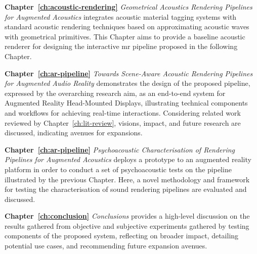 \textbf{Chapter~\ref{ch:acoustic-rendering}} \textit{Geometrical Acoustics Rendering Pipelines for Augmented Acoustics} integrates acoustic material tagging systems with standard acoustic rendering techniques based on approximating acoustic waves with geometrical primitives. This Chapter aims to provide a baseline acoustic renderer for designing the interactive \acrshort{mr} pipeline proposed in the following Chapter.

\textbf{Chapter~\ref{ch:ar-pipeline}} \textit{Towards Scene-Aware Acoustic Rendering Pipelines for Augmented Audio Reality} demonstrates the design of the proposed pipeline, expressed by the overarching research aim, as an end-to-end system for Augmented Reality Head-Mounted Displays, illustrating technical components and workflows for achieving real-time interactions. Considering related work reviewed by Chapter~\ref{ch:lit-review}, visions, impact, and future research are discussed, indicating avenues for expansions.

\textbf{Chapter~\ref{ch:ar-pipeline}} \textit{Psychoacoustic Characterisation of Rendering Pipelines for Augmented Acoustics} deploys a prototype to an augmented reality platform in order to conduct a set of psychoacoustic tests on the pipeline illustrated by the previous Chapter. Here, a novel methodology and framework for testing the characterisation of sound rendering pipelines are evaluated and discussed.

\textbf{Chapter~\ref{ch:conclusion}} \textit{Conclusions} provides a high-level discussion on the results gathered from objective and subjective experiments gathered by testing components of the proposed system, reflecting on broader impact, detailing potential use cases, and recommending future expansion avenues.


